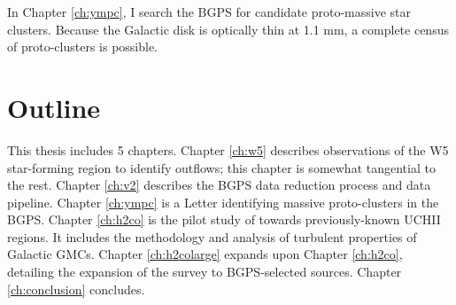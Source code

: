 In Chapter \ref{ch:ympc}, I search the BGPS for candidate proto-massive star
clusters.  Because the Galactic disk is optically thin at 1.1 mm, a complete
census of proto-clusters is possible.  


\section{Outline}
This thesis includes 5 chapters.
Chapter \ref{ch:w5} describes observations of the W5 star-forming region to identify outflows;
this chapter is somewhat tangential to the rest.
Chapter \ref{ch:v2} describes the BGPS data reduction process and data pipeline.
Chapter \ref{ch:ympc} is a Letter identifying massive proto-clusters in the BGPS.
Chapter \ref{ch:h2co} is the pilot study of \formaldehyde towards previously-known UCHII regions.
It includes the methodology and analysis of turbulent properties of Galactic GMCs.
Chapter \ref{ch:h2colarge} expands upon Chapter \ref{ch:h2co}, detailing the expansion of the \formaldehyde survey
to BGPS-selected sources.
Chapter \ref{ch:conclusion} concludes.



